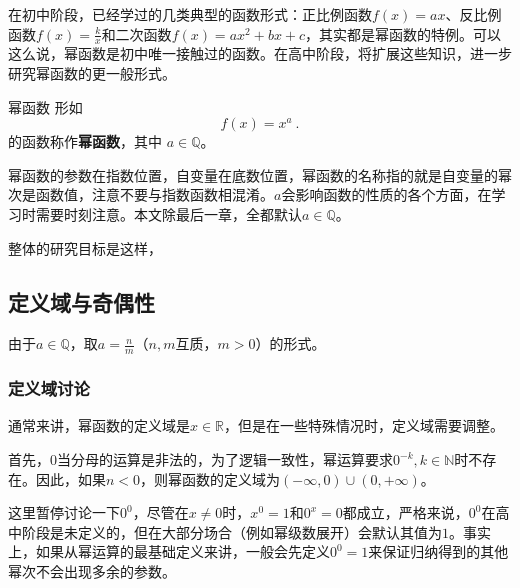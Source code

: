 
\begin{issues}
\issueDraft
\end{issues}


在初中阶段，已经学过的几类典型的函数形式：正比例函数$f(x) = ax$、反比例函数$f(x) = \frac{k}{x}$和二次函数$f(x) = ax^2+bx+c$，其实都是幂函数的特例。可以这么说，幂函数是初中唯一接触过的函数。在高中阶段，将扩展这些知识，进一步研究幂函数的更一般形式。

\begin{definition}{幂函数}
形如
\begin{equation}
f(x) = x^a~.
\end{equation}
的函数称作\textbf{幂函数}，其中 $a\in\mathbb Q$。
\end{definition}
幂函数的参数在指数位置，自变量在底数位置，幂函数的名称指的就是自变量的幂次是函数值，注意不要与指数函数相混淆。$a$会影响函数的性质的各个方面，在学习时需要时刻注意。本文除最后一章，全都默认$a\in\mathbb Q$。


整体的研究目标是这样，

\subsection{定义域与奇偶性}

由于$a\in\mathbb Q$，取$\displaystyle a=\frac{n}{m}$（$n,m$互质，$m>0$）的形式。

\subsubsection{定义域讨论}

通常来讲，幂函数的定义域是$x\in\mathbb{R}$，但是在一些特殊情况时，定义域需要调整。

首先，$0$当分母的运算是非法的，为了逻辑一致性，幂运算要求$0^{-k},k\in \mathbb{N}$时不存在。因此，如果$n<0$，则幂函数的定义域为$({-\infty},0)\cup(0,{+\infty})$。

这里暂停讨论一下$0^0$，尽管在$x\neq0$时，$x^0=1$和$0^x=0$都成立，严格来说，$0^0$在高中阶段是未定义的，但在大部分场合（例如幂级数展开）会默认其值为$1$。事实上，如果从幂运算的最基础定义来讲，一般会先定义$0^0=1$来保证归纳得到的其他幂次不会出现多余的参数。

